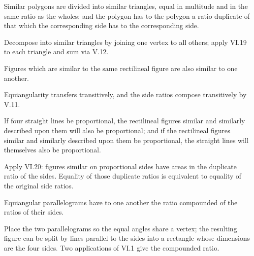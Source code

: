 \documentclass{rrxiv}
\begin{document}
\begin{claim}
\label{prop:VI.20}
Similar polygons are divided into similar triangles, equal in
multitude and in the same ratio as the wholes; and the polygon has
to the polygon a ratio duplicate of that which the corresponding side
has to the corresponding side.
\end{claim}
\begin{evidence}[Proof of VI.20]
\label{ev:VI.20}
Decompose into similar triangles by joining one vertex to all others;
apply VI.19 to each triangle and sum via V.12.
\end{evidence}

\begin{claim}
\label{prop:VI.21}
Figures which are similar to the same rectilineal figure are also
similar to one another.
\end{claim}
\begin{evidence}[Proof of VI.21]
\label{ev:VI.21}
Equiangularity transfers transitively, and the side ratios compose
transitively by V.11.
\end{evidence}

\begin{claim}
\label{prop:VI.22}
If four straight lines be proportional, the rectilineal figures
similar and similarly described upon them will also be proportional;
and if the rectilineal figures similar and similarly described upon
them be proportional, the straight lines will themselves also be
proportional.
\end{claim}
\begin{evidence}[Proof of VI.22]
\label{ev:VI.22}
Apply VI.20: figures similar on proportional sides have areas in the
duplicate ratio of the sides.  Equality of those duplicate ratios is
equivalent to equality of the original side ratios.
\end{evidence}

\begin{claim}
\label{prop:VI.23}
Equiangular parallelograms have to one another the ratio compounded
of the ratios of their sides.
\end{claim}
\begin{evidence}[Proof of VI.23]
\label{ev:VI.23}
Place the two parallelograms so the equal angles share a vertex; the
resulting figure can be split by lines parallel to the sides into a
rectangle whose dimensions are the four sides.  Two applications of
VI.1 give the compounded ratio.
\end{evidence}
\end{document}
